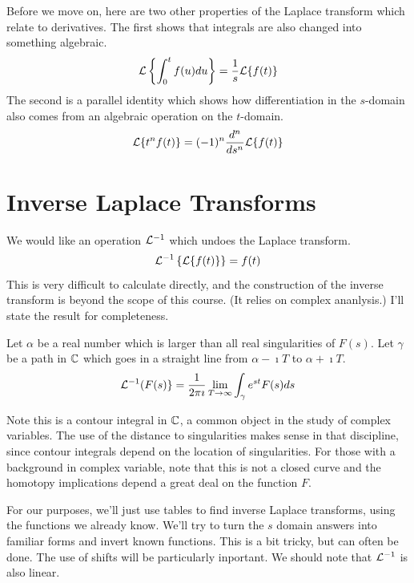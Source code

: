 \documentclass[fleqn,letterpaper]{report}
\begin{document}
Before we move on, here are two other properties of the Laplace
transform which relate to derivatives. The first shows that
integrals are also changed into something algebraic.
\begin{equation*}
\mathcal{L} \left\{ \int_0^t f(u) du \right\} = \frac{1}{s} \mathcal{L} \{
f(t) \} 
\end{equation*}
The second is a parallel identity which shows how
differentiation in the $s$-domain also comes from an algebraic
operation on the $t$-domain.
\begin{equation*}
\mathcal{L} \{ t^n f(t) \} = (-1)^n \frac{d^n}{ds^n} \mathcal{L} \{ f(t) \} 
\end{equation*}

\section{Inverse Laplace Transforms}
\label{inverse-transforms}

We would like an operation $\mathcal{L}^{-1}$ which undoes the
Laplace transform.
\begin{equation*}
\mathcal{L}^{-1} \left\{ \mathcal{L} \{ f(t) \} \right\} = f(t) 
\end{equation*}
This is very difficult to calculate directly, and the
construction of the inverse transform is beyond the scope of
this course. (It relies on complex ananlysis.) I'll state the
result for completeness.

\begin{thm}
Let $\alpha$ be a real number which is larger than all
real singularities of $F(s)$. Let $\gamma$ be a path in $\mathbb{C}$
which goes in a straight line from $\alpha - \imath T$ to
$\alpha + \imath T$. 
\begin{equation*}
\mathcal{L}^{-1} (F(s)\} = \frac{1}{2\pi \imath} \lim_{T \rightarrow
\infty} \int_{\gamma} e^{st} F(s) ds 
\end{equation*}
\end{thm}

Note this is a contour integral in $\mathbb{C}$, a common object in
the study of complex variables. The use of the
distance to singularities makes sense in that discipline,
since contour integrals depend on the location of
singularities. For those with a background in complex
variable, note that this is not a closed curve and the
homotopy implications depend a great deal on the function $F$.

For our purposes, we'll just use tables to find inverse
Laplace transforms, using the functions we already know. We'll
try to turn the $s$ domain answers into familiar forms and
invert known functions. This is a bit tricky, but can often be
done. The use of shifts will be particularly inportant. 
We should note that $\mathcal{L}^{-1}$ is also linear.
\end{document}
